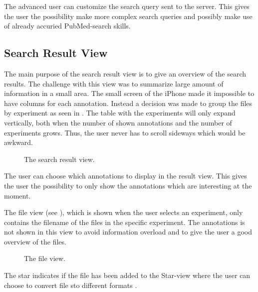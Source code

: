 The advanced user can customize the search query sent to the server. This gives the user the possibility make more complex search queries and possibly make use of already accuried PubMed-search skills.

\subsection{Search Result View}
The main purpose of the search result view is to give an overview of the search results. The challenge with this view was to summarize large amount of information in a small area. The small screen of the iPhone made it impossible to have columns for each annotation. Instead a decision was made to group the files by experiment as seen in . The table with the experiments will only expand vertically, both when the number of shown annotations and the number of experiments grows. Thus, the user never has to scroll sideways which would be awkward.

\begin{figure}[ht]
\caption{The search result view.}
\label{fig:ios_searchResult2}
\end{figure}
\FloatBarrier

The user can choose which annotations to display in the result view. This gives the user the possibility to only show the annotations which are interesting at the moment. 

The file view (see ), which is shown when the user selects an experiment, only contains the filename of the files in the specific experiment. The annotations is not shown in this view to avoid information overload and to give the user a good overview of the files.

\begin{figure}[ht]
\caption{The file view.}
\label{fig:ios_files2}
\end{figure}
\FloatBarrier

The star indicates if the file has been added to the Star-view where the user can choose to convert file sto different formats .

